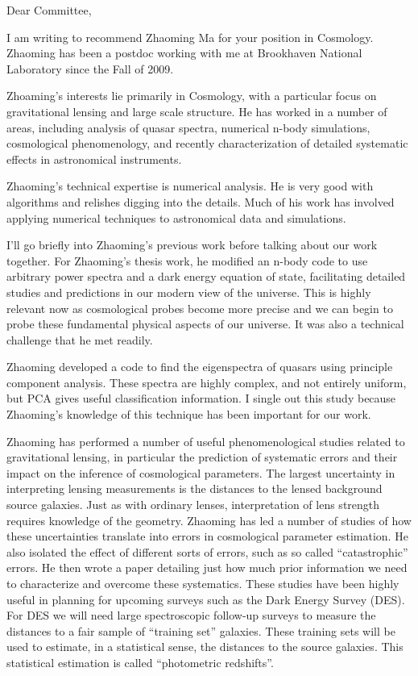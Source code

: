 \documentclass[12pt]{letter}
\begin{document}
\begin{letter}{}

\opening{Dear Committee,}

I am writing to recommend Zhaoming Ma for your position in Cosmology. Zhaoming
has been a postdoc working with me at Brookhaven National Laboratory since the
Fall of 2009.

Zhoaming's interests lie primarily in Cosmology, with a particular focus on
gravitational lensing and large scale structure.  He has worked in a number of
areas, including analysis of quasar spectra, numerical n-body simulations,
cosmological phenomenology, and recently characterization of detailed
systematic effects in astronomical instruments.

Zhaoming's technical expertise is numerical analysis. He is very good with
algorithms and relishes digging into the details.  Much of his work has
involved applying numerical techniques to astronomical data and simulations.

I'll go briefly into Zhaoming's previous work before talking about our work
together. For Zhaoming's thesis work, he modified an n-body code to use
arbitrary power spectra and a dark energy equation of state, facilitating
detailed studies and predictions in our modern view of the universe. This is
highly relevant now as cosmological probes become more precise and we can begin
to probe these fundamental physical aspects of our universe.  It was also a
technical challenge that he met readily. 

Zhaoming developed a code to find the eigenspectra of quasars using principle
component analysis.  These spectra are highly complex, and not entirely
uniform, but PCA gives useful classification information.  I single out this
study because Zhaoming's knowledge of this technique has been important for our
work.

Zhaoming has performed a number of useful phenomenological studies related to
gravitational lensing, in particular the prediction of systematic errors and
their impact on the inference of cosmological parameters.  The largest
uncertainty in interpreting lensing measurements is the distances to the lensed
background source galaxies. Just as with ordinary lenses, interpretation of
lens strength requires knowledge of the geometry.  Zhaoming has led a number of
studies of how these uncertainties translate into errors in cosmological
parameter estimation. He also isolated the effect of different sorts of errors,
such as so called ``catastrophic'' errors.  He then wrote a paper detailing
just how much prior information we need to characterize and overcome these
systematics.  These studies have been highly useful in planning for upcoming
surveys such as the Dark Energy Survey (DES). For DES we will need large
spectroscopic follow-up surveys to measure the distances to a fair sample of
``training set'' galaxies.  These training sets will be used to estimate, in a
statistical sense, the distances to the source galaxies. This statistical
estimation is called ``photometric redshifts''.


\end{letter}
\end{document}

